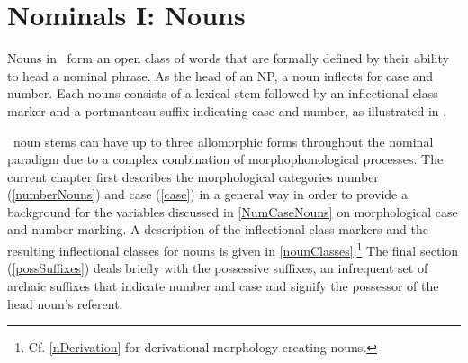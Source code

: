


\chapter{Nominals I: Nouns}\label{nouns}
Nouns in \PS\ form an open class of words that are formally defined %
by their ability to head a nominal phrase. As the head of an NP, a noun inflects for case and number. 
Each nouns consists of a lexical stem followed by an inflectional class marker and a portmanteau suffix indicating case and number, as illustrated in .
\ea\label{nounStructure}%
\z

\PS\ noun stems can have up to three allomorphic forms throughout the nominal paradigm due to a complex combination of morphophonological processes. 
The current chapter first describes the morphological categories number (\SEC\ref{numberNouns}) and case (\SEC\ref{case}) in a general way in order to provide a background for the variables discussed in \SEC\ref{NumCaseNouns} on morphological case and number marking. %
A description of the inflectional class markers and the resulting inflectional classes for nouns is given in \SEC\ref{nounClasses}.\footnote{Cf. \SEC\ref{nDerivation} for derivational morphology creating nouns.} %
The final section (\SEC\ref{possSuffixes}) deals briefly with the possessive suffixes, an infrequent set of archaic suffixes that indicate number and case and signify the possessor of the head noun’s referent. %

